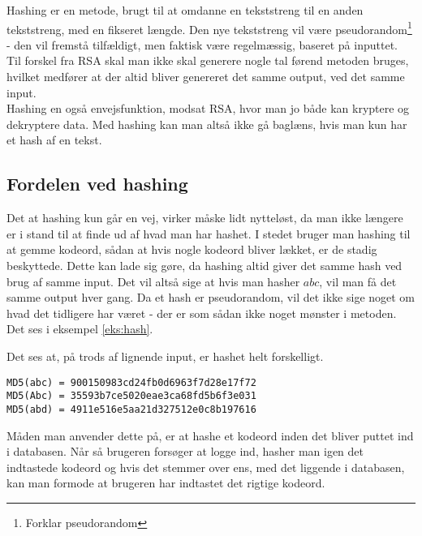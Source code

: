 Hashing er en metode, brugt til at omdanne en tekststreng til en anden tekststreng, med en fikseret længde.
Den nye tekststreng vil være pseudorandom\footnote{Forklar pseudorandom} - den vil fremstå tilfældigt, men faktisk være regelmæssig, baseret på inputtet.
Til forskel fra RSA skal man ikke skal generere nogle tal førend metoden bruges, hvilket medfører at der altid bliver genereret det samme output, ved det samme input.
\\
Hashing en også envejsfunktion, modsat RSA, hvor man jo både kan kryptere og dekryptere data.
Med hashing kan man altså ikke gå baglæns, hvis man kun har et hash af en tekst.


\subsection{Fordelen ved hashing}
Det at hashing kun går en vej, virker måske lidt nytteløst, da man ikke længere er i stand til at finde ud af hvad man har hashet.
I stedet bruger man hashing til at gemme kodeord, sådan at hvis nogle kodeord bliver lækket, er de stadig beskyttede.
Dette kan lade sig gøre, da hashing altid giver det samme hash ved brug af samme input.
Det vil altså sige at hvis man hasher \(abc\), vil man få det samme output hver gang.
Da et hash er pseudorandom, vil det ikke sige noget om hvad det tidligere har været - der er som sådan ikke noget mønster i metoden.
Det ses i eksempel \ref{eks:hash}.


\begin{eks}
    \label{eks:hash}
    Det ses at, på trods af lignende input, er hashet helt forskelligt.
    \begin{center}
        \texttt{MD5(abc) = 900150983cd24fb0d6963f7d28e17f72}\\
        \texttt{MD5(Abc) = 35593b7ce5020eae3ca68fd5b6f3e031}\\
        \texttt{MD5(abd) = 4911e516e5aa21d327512e0c8b197616}\\
    \end{center}

\end{eks}

\noindent
Måden man anvender dette på, er at hashe et kodeord inden det bliver puttet ind i databasen.
Når så brugeren forsøger at logge ind, hasher man igen det indtastede kodeord og hvis det stemmer over ens, med det liggende i databasen, kan man formode at brugeren har indtastet det rigtige kodeord.
\\

